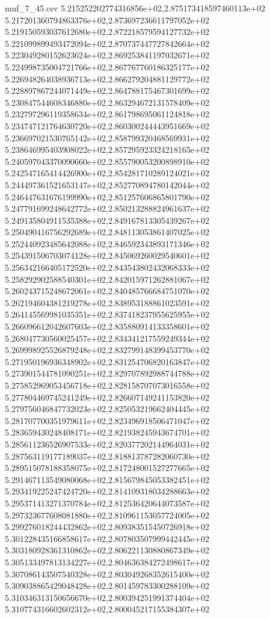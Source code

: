\begin{filecontents*}{muf_7_45.csv}
5.215252202774316856e+02,2.875173418597460113e+02
5.217201360794863376e+02,2.873697236611797052e+02
5.219150593037612680e+02,2.872218579594127732e+02
5.221099899493472094e+02,2.870737447727842664e+02
5.223049280152623624e+02,2.869253841197032671e+02
5.224998735004721766e+02,2.867767760186325177e+02
5.226948264038936713e+02,2.866279204881129772e+02
5.228897867244071449e+02,2.864788175467301699e+02
5.230847544608346880e+02,2.863294672131578409e+02
5.232797296119358634e+02,2.861798695061124818e+02
5.234747121764630720e+02,2.860300244443951669e+02
5.236697021530765142e+02,2.858799320468569931e+02
5.238646995403908022e+02,2.857295923324218165e+02
5.240597043370090660e+02,2.855790053200898910e+02
5.242547165414426900e+02,2.854281710289124021e+02
5.244497361521653147e+02,2.852770894780142044e+02
5.246447631676199990e+02,2.851257606865801790e+02
5.247791699248642772e+02,2.850213288824961637e+02
5.249135804911535388e+02,2.849167813305439267e+02
5.250490416756292689e+02,2.848113053861407025e+02
5.252440923485642088e+02,2.846592343893171346e+02
5.254391506703074128e+02,2.845069260029540601e+02
5.256342166405172520e+02,2.843543802432068333e+02
5.258292902588540301e+02,2.842015971262881067e+02
5.260243715248672061e+02,2.840485766684751070e+02
5.262194604381219278e+02,2.838953188861023591e+02
5.264145569981035351e+02,2.837418237955625955e+02
5.266096612042607603e+02,2.835880914133358601e+02
5.268047730560025457e+02,2.834341217559249344e+02
5.269998925526879248e+02,2.832799148399453770e+02
5.271950196936348902e+02,2.831254706820163847e+02
5.273901544781090251e+02,2.829707892988744788e+02
5.275852969053456718e+02,2.828158707073016558e+02
5.277804469745241249e+02,2.826607149241153820e+02
5.279756046847732023e+02,2.825053219662404445e+02
5.281707700351979611e+02,2.823496918506471047e+02
5.283659430248408171e+02,2.821938245943674701e+02
5.285611236526907533e+02,2.820377202144964031e+02
5.287563119177189037e+02,2.818813787282060730e+02
5.289515078188358075e+02,2.817248001527277665e+02
5.291467113549080068e+02,2.815679845053382451e+02
5.293419225247424720e+02,2.814109318034288663e+02
5.295371413271370784e+02,2.812536420644073587e+02
5.297323677608081880e+02,2.810961153057724005e+02
5.299276018244432862e+02,2.809383515450726918e+02
5.301228435166858617e+02,2.807803507999442445e+02
5.303180928361310862e+02,2.806221130880867349e+02
5.305133497813134227e+02,2.804636384272498617e+02
5.307086143507540328e+02,2.803049268352615400e+02
5.309038865429048428e+02,2.801459783300288109e+02
5.310346313150656670e+02,2.800394251991374404e+02
5.310774316602602312e+02,2.800045217155384307e+02

\end{filecontents*}
